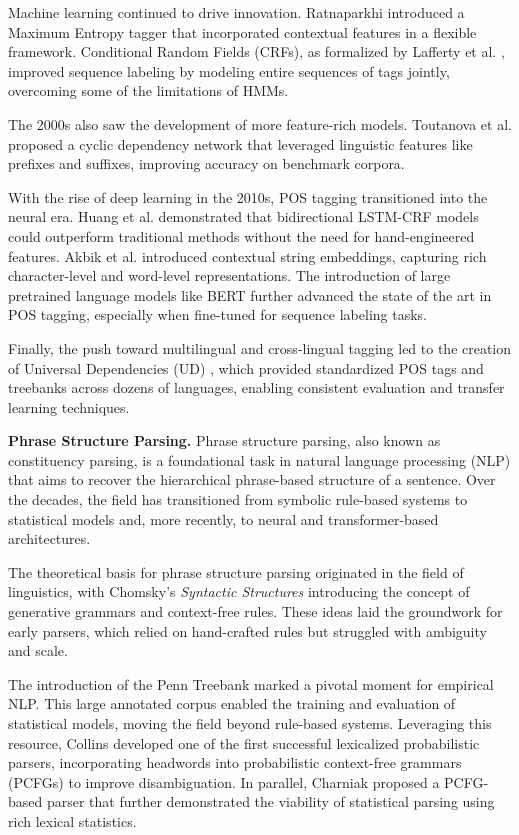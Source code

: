 Machine learning continued to drive innovation. Ratnaparkhi \cite{ratnaparkhi1996maximum} introduced a Maximum Entropy tagger that incorporated contextual features in a flexible framework. Conditional Random Fields (CRFs), as formalized by Lafferty et al. \cite{lafferty2001conditional}, improved sequence labeling by modeling entire sequences of tags jointly, overcoming some of the limitations of HMMs.

The 2000s also saw the development of more feature-rich models. Toutanova et al. \cite{toutanova2003feature} proposed a cyclic dependency network that leveraged linguistic features like prefixes and suffixes, improving accuracy on benchmark corpora.

With the rise of deep learning in the 2010s, POS tagging transitioned into the neural era. Huang et al. \cite{huang2015bidirectional} demonstrated that bidirectional LSTM-CRF models could outperform traditional methods without the need for hand-engineered features. Akbik et al. \cite{akbik2018contextual} introduced contextual string embeddings, capturing rich character-level and word-level representations. The introduction of large pretrained language models like BERT \cite{devlin2019bert} further advanced the state of the art in POS tagging, especially when fine-tuned for sequence labeling tasks.

Finally, the push toward multilingual and cross-lingual tagging led to the creation of Universal Dependencies (UD) \cite{nivre2016universal}, which provided standardized POS tags and treebanks across dozens of languages, enabling consistent evaluation and transfer learning techniques.

\textbf{Phrase Structure Parsing.} Phrase structure parsing, also known as constituency parsing, is a foundational task in natural language processing (NLP) that aims to recover the hierarchical phrase-based structure of a sentence. Over the decades, the field has transitioned from symbolic rule-based systems to statistical models and, more recently, to neural and transformer-based architectures.

The theoretical basis for phrase structure parsing originated in the field of linguistics, with Chomsky's \textit{Syntactic Structures} \cite{chomsky1957syntactic} introducing the concept of generative grammars and context-free rules. These ideas laid the groundwork for early parsers, which relied on hand-crafted rules but struggled with ambiguity and scale.

The introduction of the Penn Treebank \cite{marcus1993building} marked a pivotal moment for empirical NLP. This large annotated corpus enabled the training and evaluation of statistical models, moving the field beyond rule-based systems. Leveraging this resource, Collins \cite{collins1997three} developed one of the first successful lexicalized probabilistic parsers, incorporating headwords into probabilistic context-free grammars (PCFGs) to improve disambiguation. In parallel, Charniak \cite{charniak1997statistical} proposed a PCFG-based parser that further demonstrated the viability of statistical parsing using rich lexical statistics.

